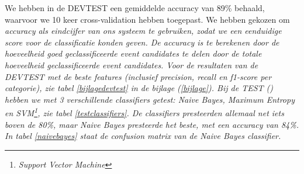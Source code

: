 {{We hebben in de DEVTEST een gemiddelde accuracy van 89\% behaald, waarvoor we 10 keer cross-validation hebben toegepast. We hebben gekozen om \it{accuracy} als
eindcijfer van ons systeem te gebruiken, zodat we een eenduidige score voor de classificatie konden geven. De accuracy is te berekenen
door de hoeveelheid goed geclassificeerde event candidates te delen door de totale hoeveelheid geclassificeerde event candidates. Voor de resultaten van de DEVTEST met de beste 
features (inclusief \it{precision}, \it{recall} en \it{f1-score} per categorie), zie tabel \ref{bijlagedevtest} in de bijlage (\ref{bijlage}). 
\vl
Bij de TEST () hebben we met 3 verschillende classifiers getest: \it{Naive Bayes}, \it{Maximum Entropy} en
\it{SVM}\footnote{\it{Support Vector Machine}}, zie tabel \ref{testclassifiers}. De classifiers presteerden allemaal net iets boven de 80\%, maar Naive Bayes
presteerde het beste, met een accuracy van 84\%. In tabel \ref{naivebayes} staat de confusion matrix van de Naive Bayes classifier.

}}
